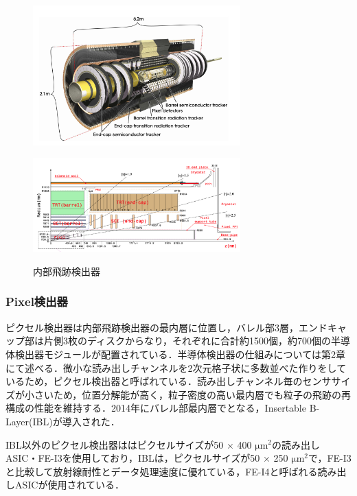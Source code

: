 \begin{figure}[h]
  \centering
  \begin{minipage}[b]{0.45\linewidth}
    \centering
    \includegraphics[width=8cm]{./figure/ID.png}
    \label{fig:ID}
  \end{minipage}
  \begin{minipage}[b]{0.45\linewidth}
    \centering
    \includegraphics[width=8cm]{./figure/pixelview.png}
    \label{fig:IDview}
  \end{minipage}
  \caption{内部飛跡検出器\cite{Collaboration_2008}}
\end{figure}

\subsubsection*{Pixel検出器}
ピクセル検出器は内部飛跡検出器の最内層に位置し，バレル部3層，エンドキャップ部は片側3枚のディスクからなり，それぞれに合計約1500個，約700個の半導体検出器モジュールが配置されている．半導体検出器の仕組みについては第2章にて述べる．微小な読み出しチャンネルを2次元格子状に多数並べた作りをしているため，ピクセル検出器と呼ばれている．読み出しチャンネル毎のセンササイズが小さいため，位置分解能が高く，粒子密度の高い最内層でも粒子の飛跡の再構成の性能を維持する．2014年にバレル部最内層でとなる，Insertable B-Layer(IBL)が導入された．\par
IBL以外のピクセル検出器ははピクセルサイズが50 $\times$ 400 $\mathrm{\mu m^2}$の読み出しASIC・FE-I3を使用しており，IBLは，ピクセルサイズが50 $\times$ 250 $\mathrm{\mu m^2}$で，FE-I3と比較して放射線耐性とデータ処理速度に優れている，FE-I4と呼ばれる読み出しASICが使用されている．\par

